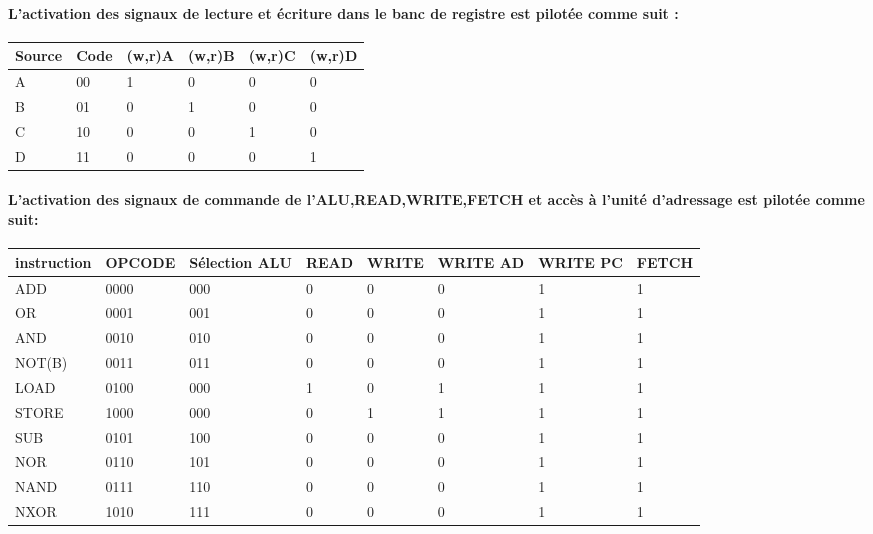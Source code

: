 \paragraph{L'activation des signaux de lecture et écriture dans le banc de registre est pilotée comme suit :}

\begin{center}
\begin{tabular} {|p{1cm}|p{1cm}|p{1cm}|p{1cm}|p{1cm}|p{1cm}|}
\hline
Source & Code & (w,r)A & (w,r)B & (w,r)C & (w,r)D\\
\hline
A & 00 & 1 & 0 & 0 & 0\\
\hline
B & 01 & 0 & 1 & 0 & 0\\
\hline
C & 10 & 0 & 0 & 1 & 0\\
\hline
D & 11 & 0 & 0 & 0 & 1\\
\hline
\end{tabular}
\end{center}

\clearpage
\paragraph{L'activation des signaux de commande de l'ALU,READ,WRITE,FETCH et accès à l'unité d'adressage est pilotée comme suit:}

\begin{center}
\begin{tabular} {|p{2cm}|p{2cm}|p{2.5cm}|p{1cm}|p{1.3cm}|p{2.1cm}|p{2cm}|p{1.3cm}|}
\hline
instruction & OPCODE & Sélection ALU & READ & WRITE & WRITE AD& WRITE PC&FETCH\\
\hline
ADD & 0000 & 000 & 0 & 0 & 0 & 1 & 1 \\
\hline
OR & 0001 & 001 & 0 & 0 & 0 & 1 & 1 \\
\hline
AND & 0010 & 010 & 0 & 0 & 0 & 1 & 1 \\
\hline
NOT(B) & 0011 & 011 & 0 & 0 & 0 & 1 & 1 \\
\hline
LOAD & 0100 & 000 & 1 & 0 & 1 & 1 & 1 \\
\hline
STORE & 1000 & 000 & 0 & 1 & 1 & 1 & 1 \\
\hline
SUB & 0101 & 100 & 0 & 0 & 0 & 1 & 1 \\
\hline
NOR & 0110 & 101 & 0 & 0 & 0 & 1 & 1 \\
\hline
NAND & 0111 & 110 & 0 & 0 & 0 & 1 & 1 \\
\hline
NXOR & 1010 & 111 & 0 & 0 & 0 & 1 & 1 \\
\hline
\end{tabular}
\end{center}

